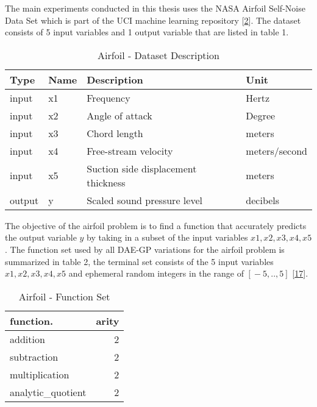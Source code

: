 \documentclass[
  11pt,
]{article}
\begin{document}
The main experiments conducted in this thesis uses the NASA Airfoil
Self-Noise Data Set which is part of the UCI machine learning repository
{[}\protect\hyperlink{ref-machine_learning_repo}{2}{]}. The dataset
consists of 5 input variables and 1 output variable that are listed in
table 1.

\begin{table}[!h]

\caption{\label{tab:airfoil_dataset_description}Airfoil - Dataset Description}
\centering
\begin{tabular}[t]{l|l|l|l}
\hline
\textbf{Type} & \textbf{Name} & \textbf{Description} & \textbf{Unit}\\
\hline
input & x1 & Frequency & Hertz\\
\hline
input & x2 & Angle of attack & Degree\\
\hline
input & x3 & Chord length & meters\\
\hline
input & x4 & Free-stream velocity & meters/second\\
\hline
input & x5 & Suction side displacement thickness & meters\\
\hline
output & y & Scaled sound pressure level & decibels\\
\hline
\end{tabular}
\end{table}

The objective of the airfoil problem is to find a function that
accurately predicts the output variable \(y\) by taking in a subset of
the input variables \(x1,x2,x3,x4,x5\). The function set used by all
DAE-GP variations for the airfoil problem is summarized in table 2, the
terminal set consists of the 5 input variables \(x1,x2,x3,x4,x5\) and
ephemeral random integers in the range of \([{}-5,..,5]\)
{[}\protect\hyperlink{ref-dae-gp_2022_symreg}{17}{]}.

\begin{table}[!h]

\caption{\label{tab:airfoil_function_set}Airfoil - Function Set}
\centering
\begin{tabular}[t]{l|r}
\hline
\textbf{function.} & \textbf{arity}\\
\hline
addition & 2\\
\hline
subtraction & 2\\
\hline
multiplication & 2\\
\hline
analytic\_quotient & 2\\
\hline
\end{tabular}
\end{table}
\end{document}
